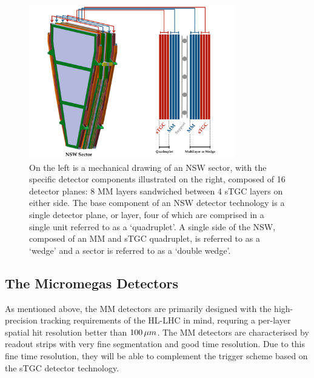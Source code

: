 \begin{figure}[!htb]
    \begin{center}
        \includegraphics[width=0.8\textwidth]{figures/nsw/nsw_sector_layoutPDF}
        \caption{
            On the left is a mechanical drawing of an NSW sector, with the specific detector
            components illustrated on the right, composed of 16 detector planes: 8 MM layers
            sandwiched between 4 sTGC layers on either side.
            The base component of an NSW detector technology is a single detector plane,
            or layer, four of which are comprised in a single unit referred to as
            a `quadruplet'.
            A single side of the NSW, composed of an MM and sTGC quadruplet, is
            referred to as a `wedge' and a sector is referred to as a `double wedge'.
        }
        \label{fig:nsw_sector_layout}
    \end{center}
\end{figure}

\subsection{The Micromegas Detectors}
\label{sec:nsw_mm}

As mentioned above, the MM detectors are primarily designed with the high-precision tracking
requirements of the HL-LHC in mind, requring a per-layer spatial hit resolution better than $100\,\mu m$.
The MM detectors are characterised by readout strips with very fine segmentation and good
time resolution.
Due to this fine time resolution, they will be able to complement the trigger scheme based
on the sTGC detector technology.

